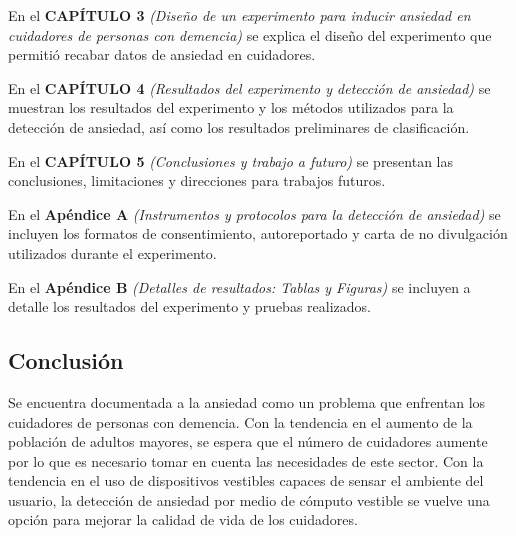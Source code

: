 	En el \textbf{CAP\'ITULO 3} \textit{(Dise\~no de un experimento para inducir ansiedad en cuidadores de personas con demencia)} se explica el dise\~no del experimento que permiti\'o recabar datos de ansiedad en cuidadores.

	En el \textbf{CAP\'ITULO 4} \textit{(Resultados del experimento y detecci\'on de ansiedad)} se muestran los resultados del experimento y los m\'etodos utilizados para la detecci\'on de ansiedad, as\'i como los resultados preliminares de clasificaci\'on.

	En el \textbf{CAP\'ITULO 5} \textit{(Conclusiones y trabajo a futuro)} se presentan las conclusiones, limitaciones y direcciones para trabajos futuros.

	En el \textbf{Ap\'endice A} \textit{(Instrumentos y protocolos para la detecci\'on de ansiedad)} se incluyen los formatos de consentimiento, autoreportado y carta de no divulgaci\'on utilizados durante el experimento.

	En el \textbf{Ap\'endice B} \textit{(Detalles de resultados: Tablas y Figuras)} se incluyen a detalle los resultados del experimento y pruebas realizados.


\subsection{Conclusi\'on}
	Se encuentra documentada a la ansiedad como un problema que enfrentan los cuidadores de personas con demencia. Con la tendencia en el aumento de la poblaci\'on de adultos mayores, se espera que el n\'umero de cuidadores aumente por lo que es necesario tomar en cuenta las necesidades de este sector. Con la tendencia en el uso de dispositivos vestibles capaces de sensar el ambiente del usuario, la detecci\'on de ansiedad por medio de c\'omputo vestible se vuelve una opci\'on para mejorar la calidad de vida de los cuidadores.

\newpage
